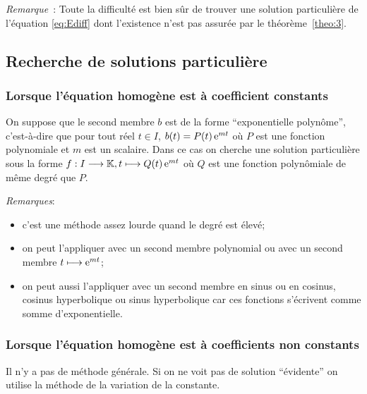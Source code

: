\emph{Remarque}~: Toute la difficulté est bien sûr de trouver une solution particulière de l'équation \eqref{eq:Ediff} dont l'existence n'est pas assurée par le théorème~\ref{theo:3}.

\subsection{Recherche de solutions particulière}
\label{subsec:recherchesolutionpart}
\subsubsection{Lorsque l'équation homogène est à coefficient constants}
\label{subsubsec:recherchesolutionpart-coefconstants}
On suppose que le second membre \(b\) est de la forme ``exponentielle polynôme'', c'est-à-dire que pour tout réel \(t \in I\), \(b(t)=P(t) \operatorname{e}^{mt}\) où \(P\) est une fonction polynomiale et \(m\) est un scalaire. Dans ce cas on cherche une solution particulière sous la forme \(f:I \longrightarrow \mathbb{K}, t \longmapsto Q(t)\operatorname{e}^{mt}\) où \(Q\) est une fonction polynômiale de même degré que \(P\).

\emph{Remarques}:
\begin{itemize}
\item c'est une méthode assez lourde quand le degré est élevé;
\item on peut l'appliquer avec un second membre polynomial ou avec un second membre \(t \longmapsto \operatorname{e}^{mt}\);
\item on peut aussi l'appliquer avec un second membre en sinus ou en cosinus, cosinus hyperbolique ou sinus hyperbolique car ces fonctions s'écrivent comme somme d'exponentielle.
\end{itemize}
\subsubsection{Lorsque l'équation homogène est à coefficients non constants}
\label{subsubsec:recherchesolutionpart-coefnnconstants}
Il n'y a pas de méthode générale. Si on ne voit pas de solution ``évidente'' on utilise la méthode de la variation de la constante.
%
